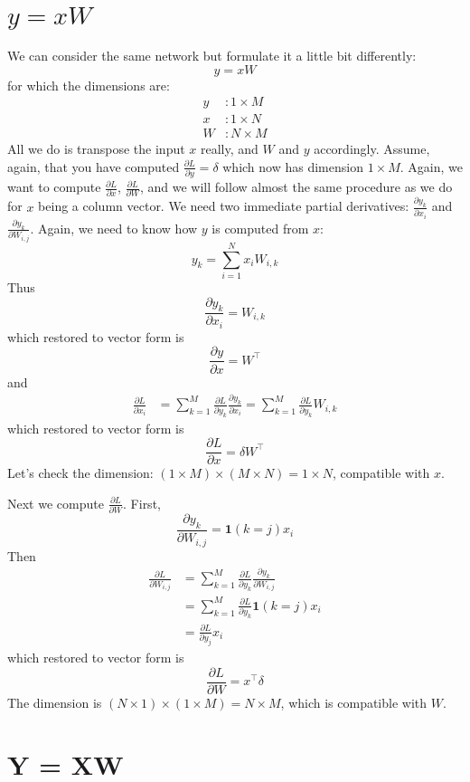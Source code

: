 \documentclass{article}
\begin{document}
\section{$y = xW$}
We can consider the same network but formulate it a little bit differently:
\begin{equation}
    y = xW
\end{equation}
for which the dimensions are:
\begin{align}
    y &: 1 \times M \\
    x &: 1 \times N \\
    W &: N \times M
\end{align}
All we do is transpose the input $x$ really, and $W$ and $y$ accordingly. Assume, again, that you have computed $\frac{\partial L}{\partial y} = \delta$ which now has dimension $1\times M$. Again, we want to compute $\frac{\partial L}{\partial x}$, $\frac{\partial L}{\partial W}$, and we will follow almost the same procedure as we do for $x$ being a column vector. We need two immediate partial derivatives: $\frac{\partial y_k}{\partial x_i}$ and $\frac{\partial y_k}{\partial W_{i, j}}$. Again, we need to know how $y$ is computed from $x$:
\begin{equation}
    y_k = \sum_{i = 1}^N x_iW_{i, k}
\end{equation}
Thus 
\begin{equation}
    \frac{\partial y_k}{\partial x_i} = W_{i, k} 
\end{equation}
which restored to vector form is
\begin{equation}
    \frac{\partial y}{\partial x} = W^\top
\end{equation}
and
\begin{align}
   \frac{\partial L}{\partial x_i} 
   &= \sum_{k=1}^M\frac{\partial L}{\partial y_k}\frac{\partial y_k}{\partial x_i} = \sum_{k=1}^M\frac{\partial L}{\partial y_k}W_{i, k} 
\end{align}
which restored to vector form is
\begin{equation}
    \frac{\partial L}{\partial x} = \delta W^\top
\end{equation}
Let's check the dimension: $(1\times M) \times (M \times N) = 1 \times N$, compatible with $x$.

Next we compute $\frac{\partial L}{\partial W}$. First, 
\begin{equation}
    \frac{\partial y_k}{\partial W_{i, j}} = \mathbf{1}(k=j)x_i
\end{equation}
Then
\begin{align}
    \frac{\partial L}{\partial W_{i, j}} 
    &= \sum_{k=1}^M\frac{\partial L}{\partial y_k}\frac{\partial y_k}{\partial W_{i, j}} \\ 
    &= \sum_{k=1}^M\frac{\partial L}{\partial y_k}\mathbf{1}(k=j)x_i \\
    &= \frac{\partial L}{\partial y_j}x_i
\end{align}
which restored to vector form is
\begin{equation}
    \frac{\partial L}{\partial W} = x^\top\delta
\end{equation}
The dimension is $(N\times 1) \times (1 \times M) = N \times M$, which is compatible with $W$.

\section{Y = XW}
\end{document}
